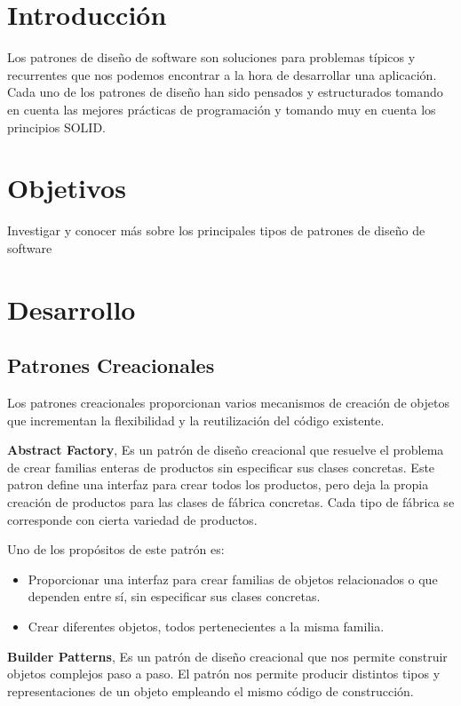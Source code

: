 \documentclass{article}
\begin{document}
\begin{multicols}{2}

\section{Introducción}
Los patrones de diseño de software son
soluciones para problemas típicos y
recurrentes que nos podemos encontrar
a la hora de desarrollar una aplicación.
Cada uno de los patrones de diseño han
sido pensados y estructurados tomando
en cuenta las mejores prácticas de
programación y tomando muy en
cuenta los principios SOLID.

\section{Objetivos}
Investigar y conocer más sobre los
principales tipos de patrones de
diseño de software

\section{Desarrollo}
\subsection{Patrones Creacionales}
Los patrones creacionales proporcionan
varios mecanismos de creación de objetos
que incrementan la flexibilidad y la
reutilización del código existente.

\textbf{Abstract Factory}, Es un patrón de
diseño creacional que resuelve el
problema de crear familias enteras de
productos sin especificar sus clases
concretas. Este patron define una
interfaz para crear todos los productos,
pero deja la propia creación de
productos para las clases de fábrica
concretas. Cada tipo de fábrica se
corresponde con cierta variedad de
productos.

Uno de los propósitos de este patrón es:
\begin{itemize}
 \item Proporcionar una interfaz
para crear familias de
objetos relacionados o que
dependen entre sí, sin
especificar sus clases
concretas.

 \item Crear diferentes objetos,
todos pertenecientes a la
misma familia.
\end{itemize}

\textbf{Builder Patterns}, Es un patrón de
diseño creacional que nos permite
construir objetos complejos paso a
paso. El patrón nos permite producir
distintos tipos y representaciones de
un objeto empleando el mismo
código de construcción.


\end{multicols}
\end{document}
